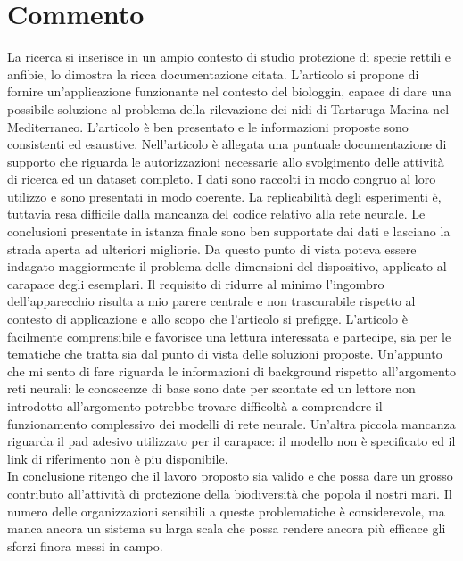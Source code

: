 \documentclass[12pt]{article}
\begin{document}
 		\section{Commento}
 			La ricerca si inserisce in un ampio contesto di studio protezione di specie rettili e anfibie, lo dimostra la ricca documentazione citata. L'articolo si propone di fornire un'applicazione funzionante nel contesto del biologgin, capace di dare una possibile soluzione al problema della rilevazione dei nidi di Tartaruga Marina nel Mediterraneo. L'articolo è ben presentato e le informazioni proposte sono consistenti ed esaustive. Nell'articolo è allegata una puntuale documentazione di supporto che riguarda le autorizzazioni necessarie allo svolgimento delle attività di ricerca ed un dataset completo. I dati sono raccolti in modo congruo al loro utilizzo e sono presentati in modo coerente. La replicabilità degli esperimenti è, tuttavia resa difficile dalla mancanza del codice relativo alla rete neurale. Le conclusioni presentate in istanza finale sono ben supportate dai dati e lasciano la strada aperta ad ulteriori migliorie. Da questo punto di vista poteva essere indagato maggiormente il problema delle dimensioni del dispositivo, applicato al carapace degli esemplari. Il requisito di ridurre al minimo l'ingombro dell'apparecchio risulta a mio parere centrale e non trascurabile rispetto al contesto di applicazione e allo scopo che l'articolo si prefigge. L'articolo è facilmente comprensibile e favorisce una lettura interessata e partecipe, sia per le tematiche che tratta sia dal punto di vista delle soluzioni proposte. Un'appunto che mi sento di fare riguarda le informazioni di background rispetto all'argomento reti neurali: le conoscenze di base sono date per scontate ed un lettore non introdotto all'argomento potrebbe trovare difficoltà a comprendere il funzionamento complessivo dei modelli di rete neurale. Un'altra piccola mancanza riguarda il pad adesivo utilizzato per il carapace: il modello non è specificato ed il link di riferimento non è piu disponibile. \\
 			In conclusione ritengo che il lavoro proposto sia valido e che possa dare un grosso contributo all'attività di protezione della biodiversità che popola il nostri mari. Il numero delle organizzazioni sensibili a queste problematiche è considerevole, ma manca ancora un sistema su larga scala che possa rendere ancora più efficace gli sforzi finora messi in campo.        
 			 	
 				
 		
\end{document}
